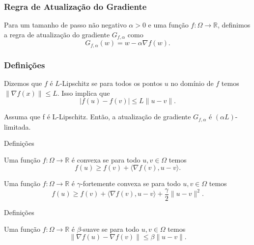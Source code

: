 \documentclass{beamer}
\begin{document}
\begin{frame}
\frametitle{Regra de Atualização do Gradiente}
\begin{definition}[3.1]
Para um tamanho de passo não negativo \(\alpha > 0\) e uma função \(f:\Omega \rightarrow \mathbb{R}\), definimos a regra de atualização do gradiente \(G_{f,\alpha}\) como
$$ G_{f,\alpha}(w) = w - \alpha\nabla f(w). $$ 
\end{definition}
\end{frame}

\begin{frame}
\frametitle{Definições}
\begin{definition}[3.2]
Dizemos que $f$ é $L$-Lipschitz se para todos os pontos $u$ no domínio de $f$ temos \(\|\nabla f(x)\| \le L\). Isso implica que
$$ |f(u) - f(v)| \le L\|u-v\|. $$ 
\end{definition}
\begin{lemma}[3.3]
Assuma que f é L-Lipschitz. Então, a atualização de gradiente \(G_{f,\alpha}\) é \((\alpha L)\)-limitada. 
\end{lemma} 
\end{frame}
 

\begin{frame}{Definições}
\begin{definition}[3.4]
Uma função \(f:\Omega \rightarrow \mathbb{R}\) é convexa se para todo \(u, v \in \Omega\) temos
$$ f(u) \ge f(v) + \langle\nabla f(v), u-v\rangle. $$
\end{definition} 
  
\begin{definition}[3.5]
Uma função \(f:\Omega \rightarrow \mathbb{R}\) é \(\gamma\)-fortemente convexa se para todo \(u, v \in \Omega\) temos
$$ f(u) \ge f(v) + \langle\nabla f(v), u-v\rangle + \frac{\gamma}{2}\|u-v\|^2. $$
\end{definition}
\end{frame}
\begin{frame}{Definições}
\begin{definition}[3.6]
Uma função \(f:\Omega \rightarrow \mathbb{R}\) é \(\beta\)-suave se para todo \(u, v \in \Omega\) temos
$$ \|\nabla f(u) - \nabla f(v)\| \le \beta\|u-v\|. $$ 
\end{definition}
\end{frame}
\end{document}
